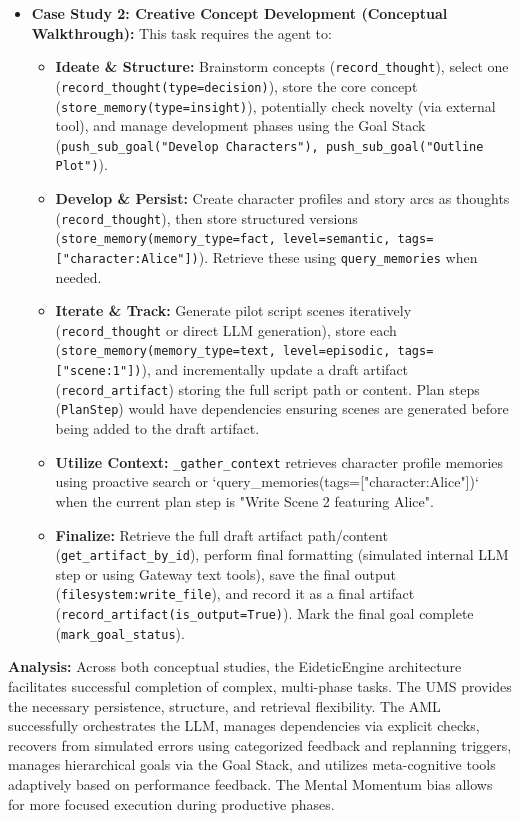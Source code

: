 \documentclass[12pt,a4paper]{article}
\newcommand{\code}[1]{\nolinkurl{#1}}
\begin{document}
\begin{itemize}
    \item \textbf{Case Study 2: Creative Concept Development (Conceptual Walkthrough):} This task requires the agent to:
    \begin{itemize}
        \item \textbf{Ideate \& Structure:} Brainstorm concepts (\code{record\_thought}), select one (\code{record\_thought(type=decision)}), store the core concept (\code{store\_memory(type=insight)}), potentially check novelty (via external tool), and manage development phases using the Goal Stack (\code{push\_sub\_goal("Develop Characters"), push\_sub\_goal("Outline Plot")}).
        \item \textbf{Develop \& Persist:} Create character profiles and story arcs as thoughts (\code{record\_thought}), then store structured versions (\code{store\_memory(memory\_type=fact, level=semantic, tags=["character:Alice"])}). Retrieve these using \code{query\_memories} when needed.
        \item \textbf{Iterate \& Track:} Generate pilot script scenes iteratively (\code{record\_thought} or direct LLM generation), store each (\code{store\_memory(memory\_type=text, level=episodic, tags=["scene:1"])}), and incrementally update a draft artifact (\code{record\_artifact}) storing the full script path or content. Plan steps (\code{PlanStep}) would have dependencies ensuring scenes are generated before being added to the draft artifact.
        \item \textbf{Utilize Context:} \code{\_gather\_context} retrieves character profile memories using proactive search or `query\_memories(tags=["character:Alice"])` when the current plan step is "Write Scene 2 featuring Alice".
        \item \textbf{Finalize:} Retrieve the full draft artifact path/content (\code{get\_artifact\_by\_id}), perform final formatting (simulated internal LLM step or using Gateway text tools), save the final output (\code{filesystem:write\_file}), and record it as a final artifact (\code{record\_artifact(is\_output=True)}). Mark the final goal complete (\code{mark\_goal\_status}).
    \end{itemize}
\end{itemize}

\textbf{Analysis:} Across both conceptual studies, the EideticEngine architecture facilitates successful completion of complex, multi-phase tasks. The UMS provides the necessary persistence, structure, and retrieval flexibility. The AML successfully orchestrates the LLM, manages dependencies via explicit checks, recovers from simulated errors using categorized feedback and replanning triggers, manages hierarchical goals via the Goal Stack, and utilizes meta-cognitive tools adaptively based on performance feedback. The Mental Momentum bias allows for more focused execution during productive phases.
\end{document}
